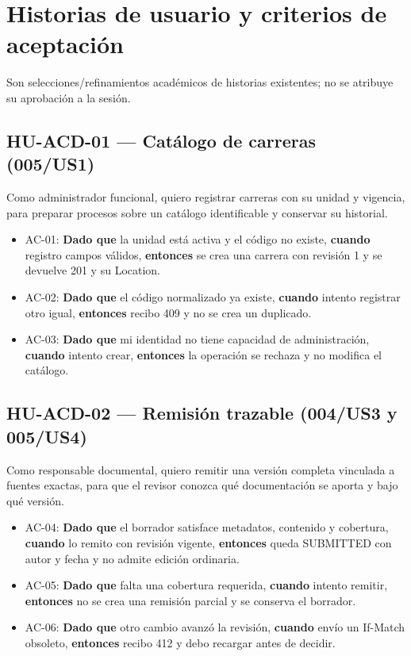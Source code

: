 \documentclass[12pt,a4paper]{report}
\providecommand{\tightlist}{\setlength{\itemsep}{0pt}\setlength{\parskip}{0pt}}
\begin{document}
\section{Historias de usuario y criterios de
aceptación}\label{historias-de-usuario-y-criterios-de-aceptaciuxf3n}

Son selecciones/refinamientos académicos de historias existentes; no se
atribuye su aprobación a la sesión.

\subsection{HU-ACD-01 --- Catálogo de carreras
(005/US1)}\label{hu-acd-01-catuxe1logo-de-carreras-005us1}

Como administrador funcional, quiero registrar carreras con su unidad y
vigencia, para preparar procesos sobre un catálogo identificable y
conservar su historial.

\begin{itemize}
\tightlist
\item
  AC-01: \textbf{Dado que} la unidad está activa y el código no existe,
  \textbf{cuando} registro campos válidos, \textbf{entonces} se crea una
  carrera con revisión 1 y se devuelve 201 y su Location.
\item
  AC-02: \textbf{Dado que} el código normalizado ya existe,
  \textbf{cuando} intento registrar otro igual, \textbf{entonces} recibo
  409 y no se crea un duplicado.
\item
  AC-03: \textbf{Dado que} mi identidad no tiene capacidad de
  administración, \textbf{cuando} intento crear, \textbf{entonces} la
  operación se rechaza y no modifica el catálogo.
\end{itemize}

\subsection{HU-ACD-02 --- Remisión trazable (004/US3 y
005/US4)}\label{hu-acd-02-remisiuxf3n-trazable-004us3-y-005us4}

Como responsable documental, quiero remitir una versión completa
vinculada a fuentes exactas, para que el revisor conozca qué
documentación se aporta y bajo qué versión.

\begin{itemize}
\tightlist
\item
  AC-04: \textbf{Dado que} el borrador satisface metadatos, contenido y
  cobertura, \textbf{cuando} lo remito con revisión vigente,
  \textbf{entonces} queda SUBMITTED con autor y fecha y no admite
  edición ordinaria.
\item
  AC-05: \textbf{Dado que} falta una cobertura requerida,
  \textbf{cuando} intento remitir, \textbf{entonces} no se crea una
  remisión parcial y se conserva el borrador.
\item
  AC-06: \textbf{Dado que} otro cambio avanzó la revisión,
  \textbf{cuando} envío un If-Match obsoleto, \textbf{entonces} recibo
  412 y debo recargar antes de decidir.
\end{itemize}
\end{document}
